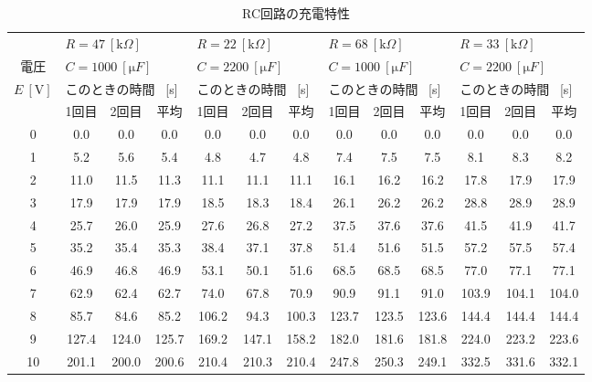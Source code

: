 \documentclass[uplatex]{jsarticle}
\begin{document}
			\begin{table}[h]
				\centering
				\small
				\caption{RC回路の充電特性}
				\begin{tabular}{c|ccc|ccc|ccc|ccc} \hline \hline
					 & \multicolumn{3}{l|}{$R = 47 \ [\mathrm k \Omega]$} & \multicolumn{3}{l|}{$R = 22 \ [\mathrm k \Omega]$} & \multicolumn{3}{l|}{$R = 68 \ [\mathrm k \Omega]$} & \multicolumn{3}{l}{$R = 33 \ [\mathrm k \Omega]$} \\
					電圧 & \multicolumn{3}{l|}{$C = 1000 \ [\mathrm \mu F]$} & \multicolumn{3}{l|}{$C = 2200 \ [\mathrm \mu F]$} & \multicolumn{3}{l|}{$C = 1000 \ [\mathrm \mu F]$} & \multicolumn{3}{l}{$C = 2200 \ [\mathrm \mu F]$} \\
					$E \ [\mathrm V]$ & \multicolumn{3}{l|}{このときの時間 \ [s]} & \multicolumn{3}{l|}{このときの時間 \ [s]} & \multicolumn{3}{l|}{このときの時間 \ [s]} & \multicolumn{3}{l}{このときの時間 \ [s]} \\ \cline{2-13}
					   & 1回目 & 2回目 & 平均  & 1回目 & 2回目 & 平均  & 1回目 & 2回目 & 平均  & 1回目 & 2回目 & 平均 \\ \hline
					0  & 0.0   & 0.0   & 0.0   & 0.0   & 0.0   & 0.0   & 0.0   & 0.0   & 0.0   & 0.0   & 0.0   & 0.0 \\ \hline
					1  & 5.2   & 5.6   & 5.4   & 4.8   & 4.7   & 4.8   & 7.4   & 7.5   & 7.5   & 8.1   & 8.3   & 8.2 \\ \hline
					2  & 11.0  & 11.5  & 11.3  & 11.1  & 11.1  & 11.1  & 16.1  & 16.2  & 16.2  & 17.8  & 17.9  & 17.9 \\ \hline
					3  & 17.9  & 17.9  & 17.9  & 18.5  & 18.3  & 18.4  & 26.1  & 26.2  & 26.2  & 28.8  & 28.9  & 28.9 \\ \hline
					4  & 25.7  & 26.0  & 25.9  & 27.6  & 26.8  & 27.2  & 37.5  & 37.6  & 37.6  & 41.5  & 41.9  & 41.7 \\ \hline
					5  & 35.2  & 35.4  & 35.3  & 38.4  & 37.1  & 37.8  & 51.4  & 51.6  & 51.5  & 57.2  & 57.5  & 57.4 \\ \hline
					6  & 46.9  & 46.8  & 46.9  & 53.1  & 50.1  & 51.6  & 68.5  & 68.5  & 68.5  & 77.0  & 77.1  & 77.1 \\ \hline
					7  & 62.9  & 62.4  & 62.7  & 74.0  & 67.8  & 70.9  & 90.9  & 91.1  & 91.0  & 103.9 & 104.1 & 104.0 \\ \hline
					8  & 85.7  & 84.6  & 85.2  & 106.2 & 94.3  & 100.3 & 123.7 & 123.5 & 123.6 & 144.4 & 144.4 & 144.4 \\ \hline
					9  & 127.4 & 124.0 & 125.7 & 169.2 & 147.1 & 158.2 & 182.0 & 181.6 & 181.8 & 224.0 & 223.2 & 223.6 \\ \hline
					10 & 201.1 & 200.0 & 200.6 & 210.4 & 210.3 & 210.4 & 247.8 & 250.3 & 249.1 & 332.5 & 331.6 & 332.1 \\ \hline
				\end{tabular}
			\end{table}
\end{document}
